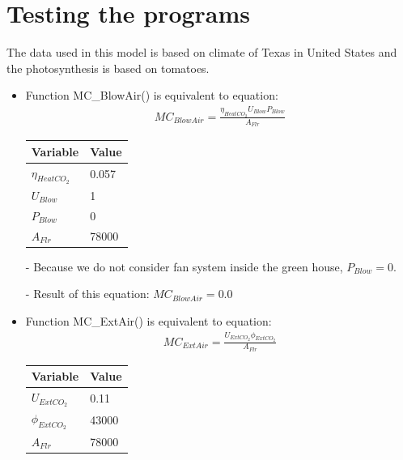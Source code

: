\documentclass[a4paper]{article}
\begin{document}
\newpage
\section{Testing the programs}
The data used in this model is based on climate of Texas in United States and the photosynthesis is based on tomatoes.
\begin{itemize}
  \item Function MC\_BlowAir() is equivalent to equation:
        \begin{align*}
          MC_{BlowAir} = \frac{\eta_{HeatCO_2}U_{Blow}P_{Blow}}{A_{Flr}}
        \end{align*}

        \begin{table}[H]
          \centering
          \begin{tabular}{|l|l|}
            \hline
            \textbf{Variable}   & \textbf{Value} \\ \hline
            \(\eta_{HeatCO_2}\) & 0.057          \\ \hline
            \(U_{Blow}\)        & 1              \\ \hline
            \(P_{Blow}\)        & 0              \\ \hline
            \(A_{Flr}\)         & 78000          \\ \hline
          \end{tabular}
        \end{table}

  \item[-] Because we do not consider fan system inside the green house, \(P_{Blow} = 0\).
  \item[-] Result of this equation: \(MC_{BlowAir} = 0.0\)

  \item Function MC\_ExtAir() is equivalent to equation:
        \begin{align*}
          MC_{ExtAir} = \frac{U_{ExtCO_2}\phi_{ExtCO_2}}{A_{Flr}}
        \end{align*}

        \begin{table}[H]
          \centering
          \begin{tabular}{|l|l|}
            \hline
            \textbf{Variable}  & \textbf{Value} \\ \hline
            \(U_{ExtCO_2}\)    & 0.11           \\ \hline
            \(\phi_{ExtCO_2}\) & 43000          \\ \hline
            \(A_{Flr}\)        & 78000          \\ \hline
          \end{tabular}
        \end{table}


\end{itemize}
\end{document}

